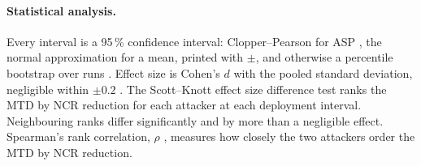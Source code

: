 \documentclass{cshonours}
\begin{document}
\paragraph{Statistical analysis.} Every interval is a 95\,\% confidence
interval: Clopper--Pearson for ASP \citep{clopper1934use}, the normal
approximation for a mean, printed with $\pm$, and otherwise a percentile
bootstrap over runs \citep{efron1994introduction}. Effect size is Cohen's $d$
with the pooled standard deviation, negligible within $\pm 0.2$
\citep{cohen1988statistical, tantithamthavorn2017empirical}. The Scott--Knott
effect size difference test \citep{tantithamthavorn2017empirical} ranks the
MTD by NCR reduction for each attacker at each deployment interval.
Neighbouring ranks differ significantly and by more than a negligible effect.
Spearman's rank correlation, $\rho$ \citep{spearman1904proof}, measures how
closely the two attackers order the MTD by NCR reduction.

\end{document}
